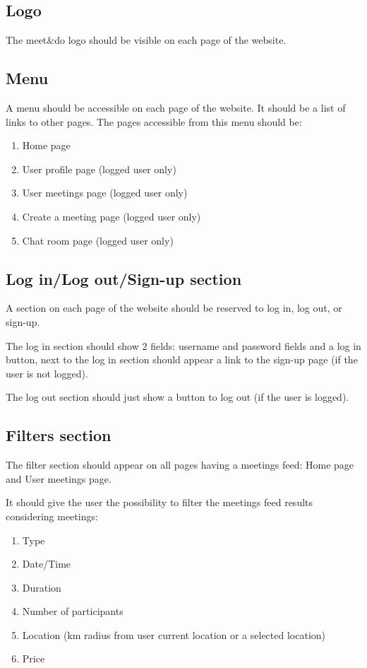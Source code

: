 \documentclass[conference]{IEEEtran}
\begin{document}
\subsection{Logo}

The meet\&do logo should be visible on each page of the website.

\subsection{Menu}

A menu should be accessible on each page of the website. It should be a list of links to other pages. The pages accessible from this menu should be:

\begin{enumerate}
    \item Home page
    \item User profile page (logged user only)
    \item User meetings page (logged user only)
    \item Create a meeting page (logged user only)
    \item Chat room page (logged user only)
\end{enumerate}

\subsection{Log in/Log out/Sign-up section}

A section on each page of the website should be reserved to log in, log out, or sign-up. 

The log in section should show 2 fields: username and password fields and a log in button, next to the log in section should appear a link to the sign-up page (if the user is not logged). 

The log out section should just show a button to log out (if the user is logged).

\subsection{Filters section}

The filter section should appear on all pages having a meetings feed: Home page and User meetings page.

It should give the user the possibility to filter the meetings feed results considering meetings:

\begin{enumerate}
    \item Type
    \item Date/Time
    \item Duration
    \item Number of participants
    \item Location (km radius from user current location or a selected location)
    \item Price
\end{enumerate}
\end{document}
